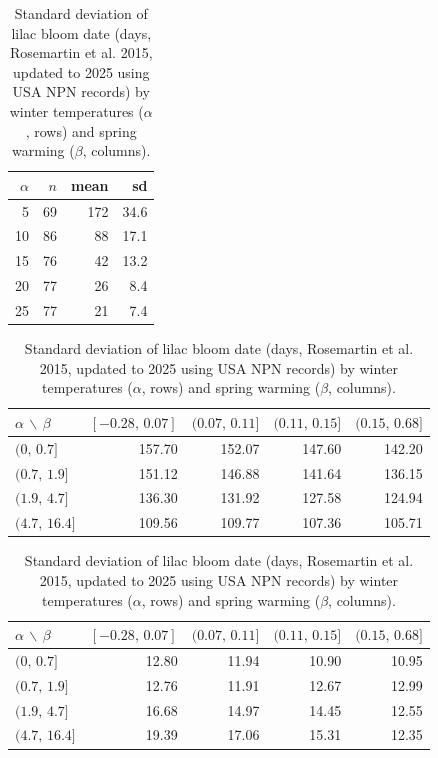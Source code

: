 \documentclass[12pt,letterpaper]{article}
\begin{document}
\begin{table}[t]
\centering
\caption{Summary data from the Walnut forcing experiment (Charrier et al. 2011).}
\label{tab:walnut_forcing}
\begin{tabular}{rrrr}
\toprule
$\alpha$ & $n$ & mean & sd \\
\midrule
 5  & 69 & 172 & 34.6  \\
10  & 86 &  88 & 17.1  \\
15  & 76 &  42 & 13.2  \\
20  & 77 &  26 &  8.4  \\
25  & 77 &  21 &  7.4  \\
\bottomrule
\end{tabular}

\vspace{2em}

\centering
\caption{Mean bloom date (day-of-year) of lilac (Rosemartin et al. 2015, updated to 2025 using USA NPN records) by winter temperatures ($\alpha$, rows) and spring warming ($\beta$, columns).}
\label{tab:mean_bloom_bins}
\begin{tabular}{lrrrr}
\toprule
$\alpha$ $\backslash$ $\beta$
& $[-0.28,\,0.07]$ & $(0.07,\,0.11]$ & $(0.11,\,0.15]$ & $(0.15,\,0.68]$ \\
\midrule
$(0,\,0.7]$     & 157.70 & 152.07 & 147.60 & 142.20 \\
$(0.7,\,1.9]$   & 151.12 & 146.88 & 141.64 & 136.15 \\
$(1.9,\,4.7]$     & 136.30 & 131.92 & 127.58 & 124.94 \\
$(4.7,\,16.4]$    & 109.56 & 109.77 & 107.36 & 105.71 \\
\bottomrule
\end{tabular}

\vspace{2em}

\centering
\caption{Standard deviation of lilac bloom date (days, Rosemartin et al. 2015, updated to 2025 using USA NPN records) by winter temperatures ($\alpha$, rows) and spring warming ($\beta$, columns).}
\label{tab:sd_bloom_bins}
\begin{tabular}{lrrrr}
\toprule
$\alpha$ $\backslash$ $\beta$
& $[-0.28,\,0.07]$ & $(0.07,\,0.11]$ & $(0.11,\,0.15]$ & $(0.15,\,0.68]$ \\
\midrule
$(0,\,0.7]$     & 12.80 & 11.94 & 10.90 &  10.95 \\
$(0.7,\,1.9]$   & 12.76 & 11.91 & 12.67 & 12.99 \\
$(1.9,\,4.7]$     & 16.68 & 14.97 & 14.45 & 12.55 \\
$(4.7,\,16.4]$    & 19.39 & 17.06 & 15.31 & 12.35 \\
\bottomrule
\end{tabular}
\end{table}
\end{document}
